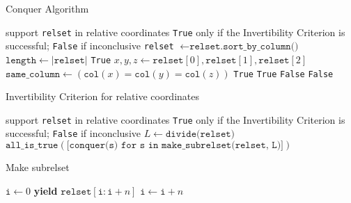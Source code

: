 \begin{algorithm}
\caption{Conquer Algorithm}
\label{alg:conquer}
\begin{algorithmic}[1]
\Require support \texttt{relset} in relative coordinates
\Ensure \texttt{True} only if the Invertibility Criterion is successful; \texttt{False} if inconclusive
    \State \texttt{relset} $\gets \texttt{relset.sort\_by\_column()}$
    \State $\texttt{length} \gets |\texttt{relset}|$
        \State \Return \texttt{True} 
        \State $x, y, z \gets \texttt{relset}[0], \texttt{relset}[1], \texttt{relset}[2]$
        \State $\texttt{same\_column} \gets (\texttt{col}(x) = \texttt{col}(y) = \texttt{col}(z))$
         
            \State \Return \texttt{True}
             
                \State \Return \texttt{True}
            \EndIf
        \EndIf
        \State \Return \texttt{False}
    \Else
        \State \Return \texttt{False}
    \EndIf
\EndFunction
\end{algorithmic}
\end{algorithm}

    
\begin{algorithm}
\caption{Invertibility Criterion for relative coordinates}
\label{alg:relcoord-inv-crit}
\begin{algorithmic}[1]
\Require support \texttt{relset} in relative coordinates
\Ensure \texttt{True} only if the Invertibility Criterion is successful; \texttt{False} if inconclusive
    \State $L \gets \texttt{divide(relset)}$
    \State \Return $\texttt{all\_is\_true}(\texttt{[conquer(s) for s in make\_subrelset(relset, L)]})$ 
\EndFunction
\end{algorithmic}
\end{algorithm}

\begin{algorithm}
\caption{Make subrelset}
\label{alg:subrelset}
\begin{algorithmic}[1]
    \State $\texttt{i} \gets 0$
        \State \textbf{yield} $\texttt{relset}[\texttt{i}:\texttt{i}+n]$
        \State $\texttt{i} \gets \texttt{i} + n$
    \EndFor
\EndFunction
\end{algorithmic}
\end{algorithm}

